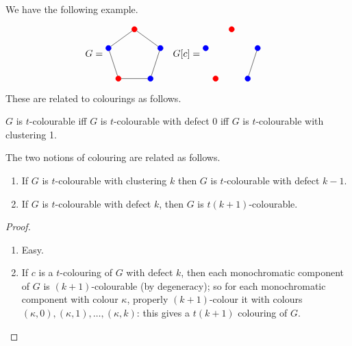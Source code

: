 \documentclass[main.tex]{subfiles}
\begin{document}
We have the following example.
\begin{example*}
  \leavevmode\vspace{-2em}
  \begin{align*}
    G &={} \begin{tikzpicture}[baseline]
          \foreach \x/\c in {0/red,1/blue,2/blue,3/red,4/blue} {
            \node[draw, \c, circle, fill=\c, inner sep=2pt]
                at ({sin(360 * \x / 5)}, {cos(360 * \x / 5)}) (\x) {};
          }
          \draw[] (0) -- (1) -- (2) -- (3) -- (4) -- (0);
    \end{tikzpicture} &
    G[c] &={} \begin{tikzpicture}[baseline]
        \foreach \x/\c in {0/red,1/blue,2/blue,3/red,4/blue} {
          \node[draw, \c, circle, fill=\c, inner sep=2pt]
              at ({sin(360 * \x / 5)}, {cos(360 * \x / 5)}) (\x) {};
        }
        \draw[] (1) -- (2);
    \end{tikzpicture}
  \end{align*}
\end{example*}
These are related to colourings as follows.
\begin{note*}
  $G$ is $t$-colourable iff $G$ is $t$-colourable with defect 0 iff $G$ is
  $t$-colourable with clustering 1.
\end{note*}
The two notions of colouring are related as follows.
\begin{proposition}
  \listhack
  \begin{enumerate}[label=(\arabic*)]
    \item If $G$ is $t$-colourable with clustering $k$ then $G$ is
      $t$-colourable with defect $k-1$.

    \item If $G$ is $t$-colourable with defect $k$,
      then $G$ is $t(k+1)$-colourable.
  \end{enumerate}
\end{proposition}
\begin{proof}
  \leavevmode\vspace{-0.5em}
  \begin{enumerate}[label=(\arabic*)]
    \item Easy.

    \item If $c$ is a $t$-colouring of $G$ with defect $k$,
      then each monochromatic component of $G$ is $(k+1)$-colourable
      (by degeneracy); so for each monochromatic component with colour $\kappa$,
      properly $(k+1)$-colour it with colours
      $(\kappa, 0), (\kappa, 1), \ldots, (\kappa, k)$: this gives a $t(k+1)$
      colouring of $G$. \qedhere
  \end{enumerate}
\end{proof}
\end{document}
